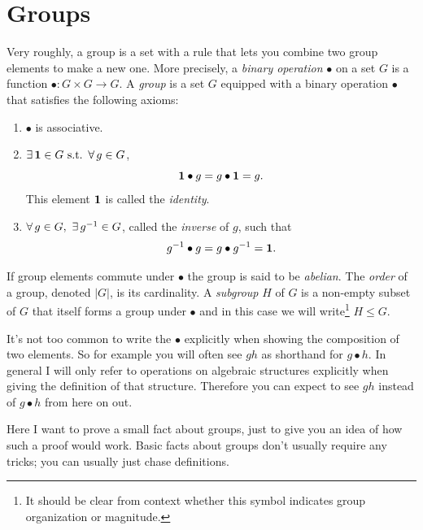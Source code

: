 \section{Groups}

Very roughly, a group is a set with a rule that lets you combine two group
elements to make a new one. More precisely, 
a {\it binary operation}  $\bullet$ on a set 
$G$ is a function $\bullet : G\times G\to G$. A {\it group} 
 is a set $G$ equipped with a binary operation $\bullet$ that satisfies 
the following axioms:
  \begin{enumerate}
    \item $\bullet$ is associative.
    \item $\operatorname{\exists} {\mathbf 1} \in G~\text{s.t.}~\operatorname{\forall} g \in G$, 
          \begin{equation}
            {\mathbf 1}\bullet g=g\bullet {\mathbf 1}=g. 
          \end{equation} This element ${\mathbf 1}$ is called the {\it identity}.
    \item $\operatorname{\forall} g \in G,~\operatorname{\exists} g^{-1} \in G$, called the 
          {\it inverse}  of $g$, such that
          \begin{equation}
            g^{-1}\bullet g=g\bullet g^{-1}={\mathbf 1}.
          \end{equation}
  \end{enumerate}
If group elements commute under $\bullet$ the group is said to be
{\it abelian}. The {\it order}  of a group, 
denoted $|G|$, is its cardinality. A {\it subgroup} 
$H$ of $G$ is a non-empty subset of $G$ that itself forms a group under 
$\bullet$ and in this case we will write\footnote{
It should be clear from context whether this symbol indicates group 
organization or magnitude.} 
$H\leq G$. 

It's not too common to write the
$\bullet$ explicitly when showing the composition of two elements. So for
example you will often see $gh$ as shorthand for $g\bullet h$. In general I will
only refer to operations on algebraic structures explicitly when giving the
definition of that structure. Therefore you can expect to see $gh$ instead of
$g\bullet h$ from here on out.

Here I want to prove a small fact about groups, just to give you an idea of how
such a proof would work. Basic facts about groups don't usually require any
tricks; you can usually just chase definitions.

